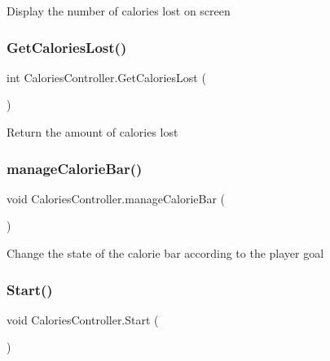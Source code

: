 Display the number of calories lost on screen \mbox{\label{class_calories_controller_a78ac27ea6bf24258bbdbfbc65e91cc9d}} 
\subsubsection{\texorpdfstring{Get\+Calories\+Lost()}{GetCaloriesLost()}}
{\footnotesize\ttfamily int Calories\+Controller.\+Get\+Calories\+Lost (\begin{DoxyParamCaption}{ }\end{DoxyParamCaption})}

Return the amount of calories lost \mbox{\label{class_calories_controller_a5973455b55655d023de4632a577b1868}} 
\subsubsection{\texorpdfstring{manage\+Calorie\+Bar()}{manageCalorieBar()}}
{\footnotesize\ttfamily void Calories\+Controller.\+manage\+Calorie\+Bar (\begin{DoxyParamCaption}{ }\end{DoxyParamCaption})\hspace{0.3cm}{\ttfamily [private]}}

Change the state of the calorie bar according to the player goal \mbox{\label{class_calories_controller_ac97768ccdf48f93721631c1b5dca134b}} 
\subsubsection{\texorpdfstring{Start()}{Start()}}
{\footnotesize\ttfamily void Calories\+Controller.\+Start (\begin{DoxyParamCaption}{ }\end{DoxyParamCaption})\hspace{0.3cm}{\ttfamily [private]}}

